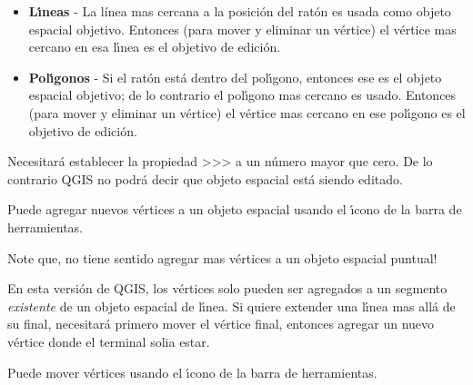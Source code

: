 \begin{itemize}
\item \textbf{L\'{\i}neas}    - La l{\'i}nea mas cercana a la posici\'on del rat\'on
                          es usada como objeto espacial objetivo.
                          Entonces (para mover y eliminar un v\'ertice)
                          el v\'ertice mas cercano
                          en esa l\'{\i}nea es el objetivo de edici\'on.

\item \textbf{Pol\'{\i}gonos} - Si el rat\'on est\'a dentro del pol\'{\i}gono, entonces ese
                          es el objeto espacial objetivo; de lo contrario el pol\'{\i}gono mas cercano
                          es usado.
                          Entonces (para mover y eliminar un v\'ertice)
                          el v\'ertice mas cercano
                          en ese pol\'{\i}gono es el objetivo de edici\'on.                          
\end{itemize}

Necesitar\'a establecer la propiedad
>>>
a un n\'umero mayor que cero.  De lo contrario QGIS no podr\'a decir que objeto espacial est\'a siendo editado.



Puede agregar nuevos v\'ertices a un objeto espacial usando el \'{\i}cono
de la barra de herramientas.

Note que, no tiene sentido agregar mas v\'ertices a un objeto espacial puntual!

En esta versi\'on de QGIS, los v\'ertices solo pueden ser agregados a un segmento \textit{existente} 
de un objeto espacial de l\'{\i}nea.  Si quiere extender una l\'{\i}nea mas all\'a de su final,
necesitar\'a primero mover el v\'ertice final, entonces agregar un nuevo v\'ertice donde
el terminal solia estar.


Puede mover v\'ertices usando el \'{\i}cono 
de la barra de herramientas.


